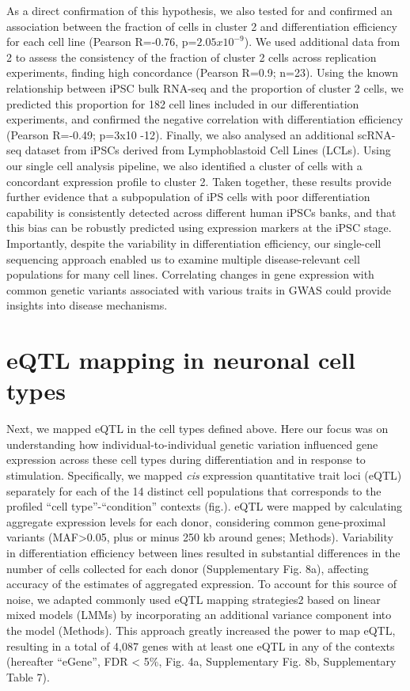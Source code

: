 As a direct confirmation of this hypothesis, we also tested for and confirmed an association between the fraction of cells in cluster 2 and differentiation efficiency for each cell line (Pearson R=-0.76, p=$2.05x10^{-9}$). 
We used additional data from 2 to assess the consistency of the fraction of cluster 2 cells across replication experiments, finding high concordance (Pearson R=0.9; n=23).
Using the known relationship between iPSC bulk RNA-seq and the proportion of cluster 2 cells, we predicted this proportion for 182 cell lines included in our differentiation experiments, and confirmed the negative correlation with differentiation efficiency (Pearson R=-0.49; p=3x10 -12). 
Finally, we also analysed an additional scRNA-seq dataset from iPSCs derived from Lymphoblastoid Cell Lines \cite{sarkar2019discovery} (LCLs). 
Using our single cell analysis pipeline, we also identified a cluster of cells with a concordant expression profile to cluster 2. 
Taken together, these results provide further evidence that a subpopulation of iPS cells with poor differentiation capability is consistently detected across different human iPSCs banks, and that this bias can be robustly predicted using expression markers at the iPSC stage. 
Importantly, despite the variability in differentiation efficiency, our single-cell sequencing approach enabled us to examine multiple disease-relevant cell populations for many cell lines. Correlating changes in gene expression with common genetic variants associated with various traits in GWAS could provide insights into disease mechanisms.

\section{eQTL mapping in neuronal cell types}

Next, we mapped eQTL in the cell types defined above.
Here our focus was on understanding how individual-to-individual genetic variation influenced gene expression across these cell types during differentiation and in response to stimulation.
Specifically, we mapped \textit{cis} expression quantitative trait loci (eQTL) separately for each of the 14 distinct cell populations that corresponds to the profiled “cell type”-“condition” contexts (fig.). 
eQTL were mapped by calculating aggregate expression levels for each donor, considering common gene-proximal variants (MAF>0.05, plus or minus 250 kb around genes; Methods). 
Variability in differentiation efficiency between lines resulted in substantial differences in the number of cells collected for each donor (Supplementary Fig. 8a), affecting accuracy of the estimates of aggregated expression. 
To account for this source of noise, we adapted commonly used eQTL mapping strategies2 based on linear mixed models (LMMs) by incorporating an additional variance component into the model (Methods). 
This approach greatly increased the power to map eQTL, resulting in a total of 4,087 genes with at least one eQTL in any of the contexts (hereafter “eGene”, FDR < 5\%, Fig. 4a, Supplementary Fig. 8b, Supplementary Table 7).


